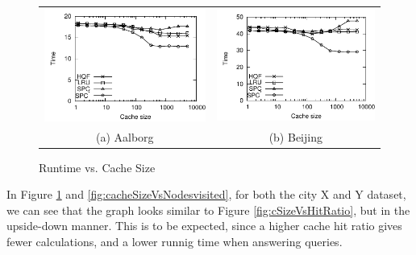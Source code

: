 \begin{figure}[htb]
\center
  \begin{tabular}{@{}c@{ }c@{}}
     \includegraphics[width=0.5\columnwidth]{figures/cachesize_runtime_aal.pdf}
     &
     \includegraphics[width=0.5\columnwidth]{figures/cachesize_runtime_bei.pdf}
      \\
     (a) Aalborg & (b)  Beijing
     \end{tabular}
\caption{Runtime vs. Cache Size}
\label{fig:cacheSizeVsHitRuntime}
\end{figure}

In Figure \ref{fig:cacheSizeVsHitRuntime} and \ref{fig:cacheSizeVsNodesvisited}, for both the city X and Y dataset,  we can see that the graph looks similar to Figure \ref{fig:cSizeVsHitRatio}, but in the upside-down manner. This is to be expected, since a higher cache hit ratio gives fewer \spath calculations, and a lower runnig time when answering queries.


